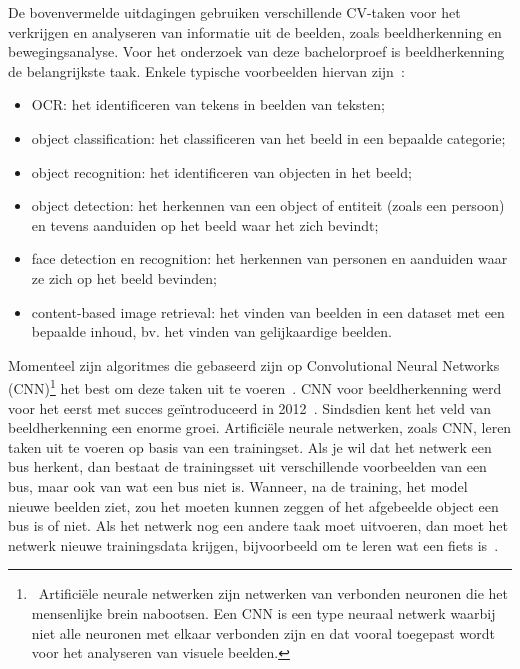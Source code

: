 De bovenvermelde uitdagingen gebruiken verschillende CV-taken voor het verkrijgen en analyseren van informatie uit de beelden, zoals beeldherkenning en bewegingsanalyse. Voor het onderzoek van deze bachelorproef is beeldherkenning de belangrijkste taak. Enkele typische voorbeelden hiervan zijn~\autocite{wikiCV}:
\begin{itemize}
	\item OCR: het identificeren van tekens in beelden van teksten;
	\item object classification: het classificeren van het beeld in een bepaalde categorie;
	\item object recognition: het identificeren van objecten in het beeld;
	\item object detection: het herkennen van een object of entiteit (zoals een persoon) en tevens aanduiden op het beeld waar het zich bevindt;
	\item face detection en recognition: het herkennen van personen en aanduiden waar ze zich op het beeld bevinden;
	\item content-based image retrieval: het vinden van beelden in een dataset met een bepaalde inhoud, bv. het vinden van gelijkaardige beelden.
\end{itemize}

Momenteel zijn algoritmes die gebaseerd zijn op Convolutional Neural Networks (CNN)\footnote{~Artificiële neurale netwerken zijn netwerken van verbonden neuronen die het mensenlijke brein nabootsen. Een CNN is een type neuraal netwerk waarbij niet alle neuronen met elkaar verbonden zijn en dat vooral toegepast wordt voor het analyseren van visuele beelden.} het best om deze taken uit te voeren~\autocites{Vu2018}{Stewart2019}. CNN voor beeldherkenning werd voor het eerst met succes geïntroduceerd in 2012~\autocite{Raval2017}. Sindsdien kent het veld van beeldherkenning een enorme groei. Artifici\"{e}le neurale netwerken, zoals CNN, leren taken uit te voeren op basis van een trainingset. Als je wil dat het netwerk een bus herkent, dan bestaat de trainingsset uit verschillende voorbeelden van een bus, maar ook van wat een bus niet is. Wanneer, na de training, het model nieuwe beelden ziet, zou het moeten kunnen zeggen of het afgebeelde object een bus is of niet. Als het netwerk nog een andere taak moet uitvoeren, dan moet het netwerk nieuwe trainingsdata krijgen, bijvoorbeeld om te leren wat een fiets is~\autocite{Pokharna2016}. 

